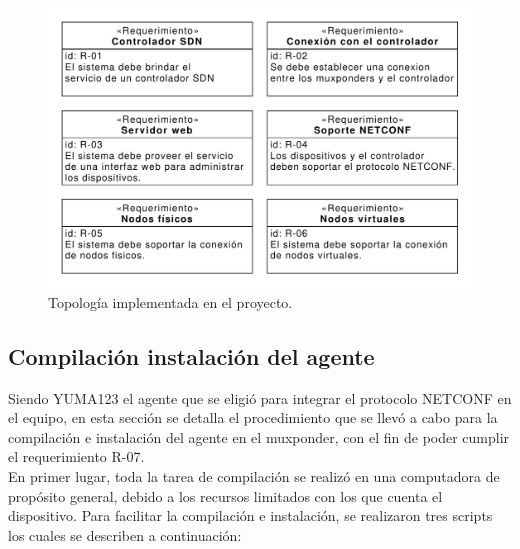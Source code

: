   \begin{figure}[H]
    \centering
    \includegraphics[scale=0.65]{Figures/req_sys.pdf}
    \caption{Topología implementada en el proyecto.}
    \label{fig:req_sys}
  \end{figure}

  \subsection{Compilación instalación del agente}
Siendo YUMA123 el agente que se eligió para integrar el protocolo NETCONF en el equipo, en esta sección se detalla el procedimiento que se llevó a cabo para la compilación e instalación del agente en el muxponder, con el fin de poder cumplir el requerimiento R-07.
\\

  En primer lugar, toda la tarea de compilación se realizó en una computadora de propósito general, debido a los recursos limitados con los que cuenta el dispositivo. Para facilitar la compilación e instalación, se realizaron tres scripts los cuales se describen a continuación:

